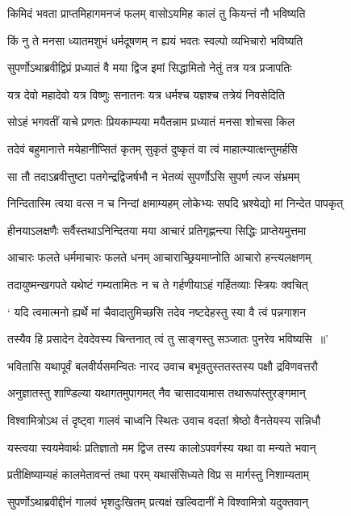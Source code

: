 \twolineshloka
{किमिदं भवता प्राप्तमिहागमनजं फलम्}
{वासोऽयमिह कालं तु कियन्तं नौ भविष्यति}


\twolineshloka
{किं नु ते मनसा ध्यातमशुभं धर्मदूषणम्}
{न ह्ययं भवतः स्वल्पो व्यभिचारो भविष्यति}


\twolineshloka
{सुपर्णोऽथाब्रवीद्विप्रं प्रध्यातं वै मया द्विज}
{इमां सिद्धामितो नेतुं तत्र यत्र प्रजापतिः}


\twolineshloka
{यत्र देवो महादेवो यत्र विष्णुः सनातनः}
{यत्र धर्मश्च यज्ञश्च तत्रेयं निवसेदिति}


\twolineshloka
{सोऽहं भगवतीं याचे प्रणतः प्रियकाम्यया}
{मयैतन्नाम प्रध्यातं मनसा शोचसा किल}


\twolineshloka
{तदेवं बहुमानात्ते मयेहानीप्सितं कृतम्}
{सुकृतं दुष्कृतं वा त्वं माहात्म्यात्क्षन्तुमर्हसि}


\twolineshloka
{सा तौ तदाऽब्रवीत्तुष्टा पतगेन्द्रद्विजर्षभौ}
{न भेतव्यं सुपर्णोऽसि सुपर्ण त्यज संभ्रमम्}


\twolineshloka
{निन्दितास्मि त्वया वत्स न च निन्दां क्षमाम्यहम्}
{लोकेभ्यः सपदि भ्रश्येद्यो मां निन्देत पापकृत्}


\twolineshloka
{हीनयाऽलक्षणैः सर्वैस्तथाऽनिन्दितया मया}
{आचारं प्रतिगृह्णन्त्या सिद्धिः प्राप्तेयमुत्तमा}


\twolineshloka
{आचारः फलते धर्ममाचारः फलते धनम्}
{आचाराच्छ्रियमाप्नोति आचारो हन्त्यलक्षणम्}


\twolineshloka
{तदायुष्मन्खगपते यथेष्टं गम्यतामितः}
{न च ते गर्हणीयाऽहं गर्हितव्याः स्त्रियः क्वचित्}


\twolineshloka
{` यदि त्वमात्मनो ह्यर्थे मां चैवादातुमिच्छसि}
{तदेव नष्टदेहस्तु स्या वै त्वं पन्नगाशन}


\twolineshloka
{तस्यैव हि प्रसादेन देवदेवस्य चिन्तनात्}
{त्वं तु साङ्गस्तु सञ्जातः पुनरेव भविष्यसि ॥'}


\threelineshloka
{भवितासि यथापूर्वं बलवीर्यसमन्वितः}
{नारद उवाच}
{बभूवतुस्ततस्तस्य पक्षौ द्रविणवत्तरौ}


\twolineshloka
{अनुज्ञातस्तु शाण्डिल्या यथागतमुपागमत्}
{नैव चासादयामास तथारूपांस्तुरङ्गमान्}


\twolineshloka
{विश्वामित्रोऽथ तं दृष्ट्वा गालवं चाध्वनि स्थितः}
{उवाच वदतां श्रेष्ठो वैनतेयस्य सन्निधौ}


\twolineshloka
{यस्त्वया स्वयमेवार्थः प्रतिज्ञातो मम द्विज}
{तस्य कालोऽपवर्गस्य यथा वा मन्यते भवान्}


\twolineshloka
{प्रतीक्षिष्याम्यहं कालमेतावन्तं तथा परम्}
{यथासंसिध्यते विप्र स मार्गस्तु निशाम्यताम्}


\twolineshloka
{सुपर्णोऽथाब्रवीद्दीनं गालवं भृशदुःखितम्}
{प्रत्यक्षं खल्विदानीं मे विश्वामित्रो यदुक्तवान्}


